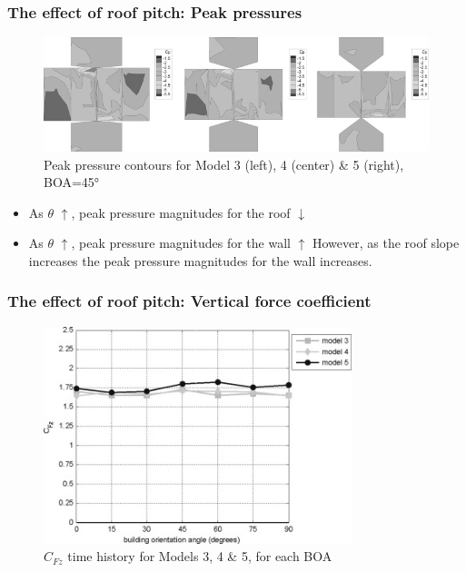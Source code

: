\documentclass[handout]{beamer}
\begin{document}
\begin{frame}
	\frametitle{The effect of roof pitch: Peak pressures}
	\begin{figure}
		\centering
		\includegraphics[width=\textwidth]{./fig/7.jpg}
		\caption{Peak pressure contours for Model 3 (left), 4 (center) \& 5 (right), BOA=\ang{45}}
	\end{figure}
	\begin{itemize}
		\item<2-> As $\theta$ $\uparrow$, peak pressure magnitudes for the \alert{roof} $\downarrow$
		\item<3-> As $\theta$ $\uparrow$, peak pressure magnitudes for the \alert{wall} $\uparrow$
			 {However, as the roof slope increases the peak pressure magnitudes for the wall increases.}
	\end{itemize}
\end{frame}

\begin{frame}
	\frametitle{The effect of roof pitch: Vertical force coefficient}
	\begin{figure}
		\includegraphics[width=0.8\textwidth]{./fig/8.jpg}
		\caption{$C_{Fz}$ time history for Models 3, 4 \& 5, for each BOA}
	\end{figure}
\end{frame}
\end{document}
